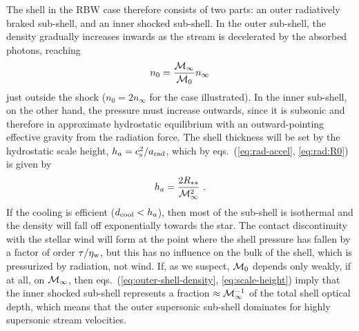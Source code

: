 The shell in the RBW case therefore consists of two parts: an outer
radiatively braked sub-shell, and an inner shocked sub-shell.  In the
outer sub-shell, the density gradually increases inwards as the stream
is decelerated by the absorbed photons, reaching
\begin{equation}
  \label{eq:outer-shell-density}
  n_0 = \frac{\mathcal{M}_\infty}{\mathcal{M}_0} n_\infty
\end{equation}
just outside the shock (\(n_0 = 2 n_\infty\) for the case illustrated).  In
the inner sub-shell, on the other hand, the pressure must increase
outwards, since it is subsonic and therefore in approximate
hydrostatic equilibrium with an outward-pointing effective gravity
from the radiation force.  The shell thickness will be set by the
hydrostatic scale height, \(h_a = c_{\text{s}}^2 / a_{\text{rad}}\), which by
eqs.~(\ref{eq:rad-accel}, \ref{eq:rad:R0}) is given by
\begin{equation}
  \label{eq:scale-height}
  h_a = \frac{2 R_{**}}{\mathcal{M}_\infty^2} \ .
\end{equation}
If the cooling is efficient (\(d_{\text{cool}} < h_a\)), then most of the
sub-shell is isothermal and the density will fall off exponentially
towards the star.  The contact discontinuity with the stellar wind
will form at the point where the shell pressure has fallen by a factor
of order \(\tau / \eta_{\text{w}}\), but this has no influence on the bulk of the
shell, which is pressurized by radiation, not wind.  If, as we
suspect, \(\mathcal{M}_0\) depends only weakly, if at all, on \(\mathcal{M}_\infty\), then
eqs.~(\ref{eq:outer-shell-density}, \ref{eq:scale-height}) imply that
the inner shocked sub-shell represents a fraction
\(\approx \mathcal{M}_\infty^{-1}\) of the total shell optical depth, which means that the
outer supersonic sub-shell dominates for highly supersonic stream
velocities.

